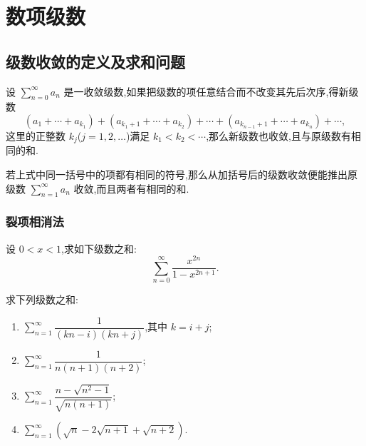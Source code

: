 \documentclass[../../数学分析培优讲义.tex]{subfiles}
\begin{document}
\setcounter{chapter}{7}
\pagestyle{fancy}

\chapter{数项级数}


\section{级数收敛的定义及求和问题}

\begin{theorem}
设 $\displaystyle\sum\limits_{n=0}^{\infty}a_n$ 是一收敛级数,如果把级数的项任意结合而不改变其先后次序,得新级数
\[
(a_1+\cdots+a_{k_1})+(a_{k_1+1}+\cdots+a_{k_2})+\cdots
+(a_{k_{n-1}+1}+\cdots+a_{k_n})+\cdots,
\]
这里的正整数 $k_j$($j=1,2,\ldots$)满足 $k_1<k_2<\cdots$,那么新级数也收敛,且与原级数有相同的和.
\end{theorem}

\begin{theorem}[\markstar]
若上式中同一括号中的项都有相同的符号,那么从加括号后的级数收敛便能推出原级数 $\displaystyle\sum\limits_{n=1}^{\infty}a_n$ 收敛,而且两者有相同的和.
\end{theorem}



\subsection{裂项相消法}

\begin{example}
设 $0<x<1$,求如下级数之和:
\[
    \sum\limits_{n=0}^{\infty}\dfrac{x^{2n}}{1-x^{2n+1}}.
\]
\end{example}
\exampleblank

\begin{example}
求下列级数之和:
\begin{enumerate}[label=(\arabic*)]
    \item $\displaystyle\sum\limits_{n=1}^{\infty}\dfrac{1}{(kn-i)(kn+j)}$,其中 $k=i+j$;
    \item $\displaystyle\sum\limits_{n=1}^{\infty}\dfrac{1}{n(n+1)(n+2)}$;
    \item $\displaystyle\sum\limits_{n=1}^{\infty}\dfrac{n-\sqrt{n^2-1}}{\sqrt{n(n+1)}}$;
    \item $\displaystyle\sum\limits_{n=1}^{\infty}(\sqrt{n}-2\sqrt{n+1}+\sqrt{n+2})$.
\end{enumerate}
\end{example}
\exampleblank
\end{document}
